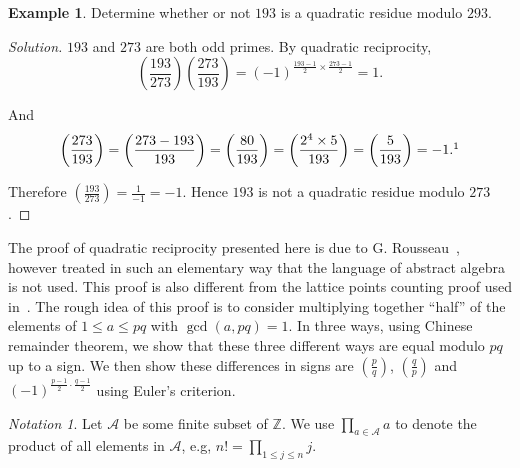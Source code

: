 \documentclass{amsbook}
\theoremstyle{plain}
\theoremstyle{definition}
\newtheorem{example}[theorem]{Example}
\theoremstyle{remark}
\newtheorem{notation}[theorem]{Notation}
\numberwithin{equation}{chapter}
\numberwithin{figure}{chapter}
\newcommand{\Z}{\mathbb{Z}}
\newcommand{\sA}{\mathcal{A}}
\begin{document}
\begin{example}
  Determine whether or not $193$ is a quadratic residue modulo $293$.
\end{example}
\begin{proof}[Solution]
  $193$ and $273$ are both odd primes. By quadratic reciprocity,
  \[
    \left( \frac{193}{273} \right) \left( \frac{273}{193} \right) = (-1)^{\frac{193-1}2 \times \frac{273-1}2} = 1.
  \]

  And 
  \[
  \left( \frac{273}{193} \right) = \left( \frac{273 - 193}{193} \right) = \left( \frac{80}{193} \right) = \left( \frac{2^4\times 5}{193} \right) = \left( \frac{5}{193} \right) = -1.\footnotemark
  \]

Therefore $\left( \frac{193}{273} \right) = \frac{1}{-1} = -1$. Hence $193$ is not a quadratic residue modulo $273$.
\end{proof}

The proof of quadratic reciprocity presented here is due to G. Rousseau~\cite{Rousseau1991}, however treated in such an elementary way that the language of abstract algebra is not used. This proof is also different from the lattice points counting proof used in~\cite{Strayer2001}. The rough idea of this proof is to consider multiplying together ``half'' of the elements of $1 \leqslant a \leqslant pq$ with $\gcd (a, pq) = 1$. In three ways, using Chinese remainder theorem, we show that these three different ways are equal modulo $pq$ up to a sign. We then show these differences in signs are $\left( \frac{p}q \right)$, $\left( \frac{q}p \right)$ and $(-1)^{\frac{p-1}2 \cdot \frac{q-1}2}$ using Euler's criterion. 

\begin{notation}
  Let $\sA$ be some finite subset of $\Z$. We use $\prod_{a \in \sA} a$ to denote the product of all elements in $\sA$, e.g, $n! = \prod_{1 \leqslant j \leqslant n} j$.
\end{notation}
\end{document}
